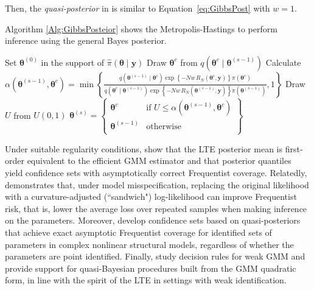 Then, the \textit{quasi-posterior} in \cite{chernozhukov2003mcmc} is similar to Equation~\ref{eq:GibbsPost} with $w=1$.

Algorithm \ref{Alg:GibbsPosteior} shows the Metropolis-Hastings to perform inference using the general Bayes posterior.

\begin{algorithm}[h!]
	\caption{General Bayes posterior: Metropolis-Hastings algorithm}\label{Alg:GibbsPosteior}
	\begin{algorithmic}[1]
		\State Set $\bm{\theta}^{(0)}$ in the support of $\hat{\pi}(\bm{\theta}\mid \bm{y})$  		 			
		\State Draw $\bm{\theta}^{c}$ from $q(\bm{\theta}^{c}\mid \bm{\theta}^{(s-1)})$
		\State Calculate $\alpha(\bm{\theta}^{(s-1)}, \bm{\theta}^{c}) = 
		\min\left\{\frac{q(\bm{\theta}^{(s-1)} \mid  \bm{\theta}^{c}) \exp\left\{-Nw\,R_N(\boldsymbol{\theta}^c,\mathbf{y})\right\}\pi(\boldsymbol{\theta}^c)}{q(\bm{\theta}^{c} \mid  \bm{\theta}^{(s-1)}) \exp\left\{-Nw\,R_N(\boldsymbol{\theta}^{(s-1)},\mathbf{y})\right\}\pi(\boldsymbol{\theta}^{(s-1)})}, 1\right\}$
		\State Draw $U$ from $U(0,1)$
		\State $\bm{\theta}^{(s)}=\begin{Bmatrix}
			\bm{\theta}^{c} & \text{if } U\leq \alpha(\bm{\theta}^{(s-1)}, \bm{\theta}^{c})\\
			\bm{\theta}^{(s-1)} & \text{otherwise}\\
		\end{Bmatrix}$
		\EndFor 
	\end{algorithmic} 
\end{algorithm}

Under suitable regularity conditions, \cite{chernozhukov2003mcmc} show that the LTE posterior mean is first-order equivalent to the efficient GMM estimator and that posterior quantiles yield confidence sets with asymptotically correct Frequentist coverage. Relatedly, \cite{Muller2013SandwichBayes} demonstrates that, under model misspecification, replacing the original likelihood with a curvature-adjusted (``sandwich") log-likelihood can improve Frequentist risk, that is, lower the average loss over repeated samples when making inference on the parameters. Moreover, \cite{ChenChristensenTamer2018} develop confidence sets based on quasi-posteriors that achieve exact asymptotic Frequentist coverage for identified sets of parameters in complex nonlinear structural models, regardless of whether the parameters are point identified. Finally, \cite{andrews2022weakgmm} study decision rules for weak GMM and provide support for quasi-Bayesian procedures built from the GMM quadratic form, in line with the spirit of the LTE in settings with weak identification.\\

